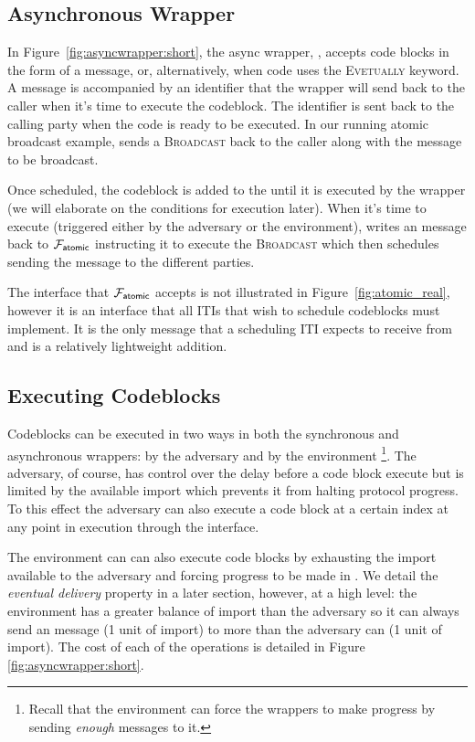 
\subsection{Asynchronous Wrapper}
In Figure~\ref{fig:asyncwrapper:short}, the async wrapper, \Wasync, accepts code blocks in the form of a  message, or, alternatively, when code uses the \textsc{Evetually} keyword.
A  message is accompanied by an identifier that the wrapper will send back to the caller when it's time to execute the codeblock.
The identifier is sent back to the calling party when the code is ready to be executed. 
In our running atomic broadcast example, \Wasync sends a \textsc{Broadcast} back to the caller along with the message to be broadcast.

Once scheduled, the codeblock is added to the  until it is executed by the wrapper (we will elaborate on the conditions for execution later).
When it's time to execute (triggered either by the adversary or the environment), \Wasync writes an \Exec message back to $\mathcal{F}_{{\mathsf {atomic}}}$ instructing it to execute the \textsc{Broadcast} which then schedules sending the message to the different parties. 

The \Exec interface that $\mathcal{F}_{{\mathsf {atomic}}}$ accepts is not illustrated in Figure~\ref{fig:atomic_real}, however it is an interface that all ITIs that wish to schedule codeblocks must implement.
It is the only message that a scheduling ITI expects to receive from \Wasync and is a relatively lightweight addition. 

\subsection{Executing Codeblocks}
Codeblocks can be executed in two ways in both the synchronous and asynchronous wrappers: by the adversary and by the environment \footnote{Recall that the environment can force the wrappers to make progress by sending {\em enough} \Advance messages to it.}.
The adversary, of course, has control over the delay before a code block execute but is limited by the available import which prevents it from halting protocol progress.
To this effect the adversary can also execute a code block at a certain index at any point in execution through the \Exec interface.

The environment can can also execute code blocks by exhausting the import available to the adversary and forcing progress to be made in \Wasync.
We detail the {\em eventual delivery} property in a later section, however, at a high level: the environment has a greater balance of import than the adversary so it can always send an \Advance message (1 unit of import) to \Wasync more than the adversary can \Delay (1 unit of import).
The cost of each of the operations is detailed in Figure \ref{fig:asyncwrapper:short}.

